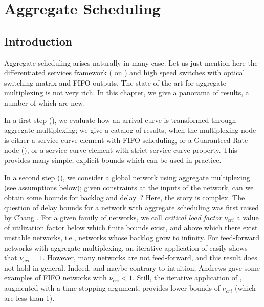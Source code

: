 \chapter{Aggregate Scheduling}


\section{Introduction}

Aggregate scheduling arises naturally in many case. Let us just
mention here the differentiated services framework (
on ) and high speed switches with optical switching
matrix and FIFO outputs. The state of the art for aggregate
multiplexing is not very rich. In this chapter, we give a panorama
of results, a number of which are new.

In a first step (), we evaluate how an
arrival curve is transformed through aggregate multiplexing; we
give a catalog of results, when the multiplexing node is either a
service curve element with FIFO scheduling, or a Guaranteed Rate
node (), or a service curve element with strict
service curve property. This provides many simple, explicit bounds
which can be used in practice.

In a second step (), we consider a global
network using aggregate multiplexing (see assumptions below);
given constraints at the inputs of the network, can we obtain some
bounds for backlog and delay~? Here, the story is complex. The
question of delay bounds for a network with aggregate scheduling
was first raised by Chang \cite{cha91}. For a given family of
networks, we call \emph{critical load factor} $\nu_{cri}$ a value
of utilization factor below which finite bounds exist, and above
which there exist unstable networks, i.e., networks whose backlog
grow to infinity. For feed-forward networks with aggregate
multiplexing, an iterative application of 
easily shows that $\nu_{cri}=1$. However, many networks are not
feed-forward, and this result does not hold in general. Indeed,
and maybe contrary to intuition, Andrews \cite{andrews00} gave
some examples of FIFO networks with $\nu_{cri} < 1$. Still, the
iterative application of , augmented with a
time-stopping argument, provides lower bounds of $\nu_{cri}$
(which are less than 1).

